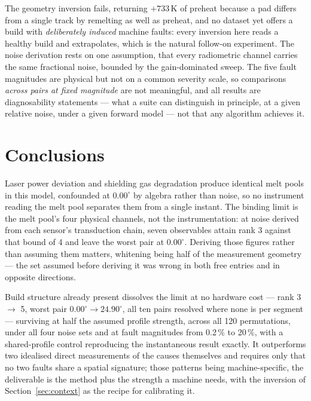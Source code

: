 \documentclass[final,5p,times,twocolumn]{elsarticle}
\begin{document}
The geometry inversion fails, returning $+733$\,K of preheat because a pad
differs from a single track by remelting as well as preheat, and no dataset yet
offers a build with \emph{deliberately induced} machine faults: every inversion
here reads a healthy build and extrapolates, which is the natural follow-on
experiment. The noise derivation rests on one assumption, that every radiometric
channel carries the same fractional noise, bounded by the gain-dominated sweep.
The five fault magnitudes are physical but not on a common severity scale, so
comparisons \emph{across pairs at fixed magnitude} are not meaningful, and all
results are diagnosability statements --- what a suite can distinguish in
principle, at a given relative noise, under a given forward model --- not that
any algorithm achieves it.

\section{Conclusions}

Laser power deviation and shielding gas degradation produce identical melt pools
in this model, confounded at $0.00^\circ$ by algebra rather than noise, so no
instrument reading the melt pool separates them from a single instant. The
binding limit is the melt pool's four physical channels, not the instrumentation:
at noise derived from each sensor's transduction chain, seven observables attain
rank 3 against that bound of 4 and leave the worst pair at $0.00^\circ$. Deriving
those figures rather than assuming them matters, whitening being half of the
measurement geometry --- the set assumed before deriving it was wrong in both
free entries and in opposite directions.

Build structure already present dissolves the limit at no hardware cost --- rank
3 $\rightarrow$ 5, worst pair $0.00^\circ \rightarrow 24.90^\circ$, all ten pairs
resolved where none is per segment --- surviving at half the assumed profile
strength, across all 120 permutations, under all four noise sets and at fault
magnitudes from 0.2\,\% to 20\,\%, with a shared-profile control reproducing the
instantaneous result exactly. It outperforms two idealised direct measurements of
the causes themselves and requires only that no two faults share a spatial
signature; those patterns being machine-specific, the deliverable is the method
plus the strength a machine needs, with the inversion of
Section~\ref{sec:context} as the recipe for calibrating it.
\end{document}
